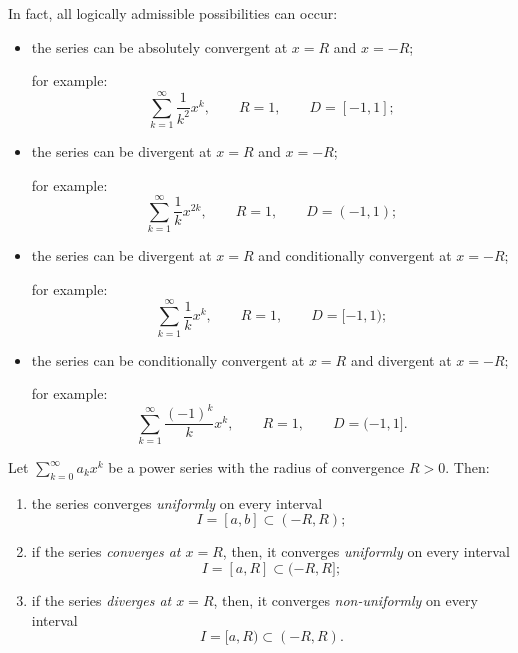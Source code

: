 In fact, all logically admissible possibilities can occur:
\begin{itemize}
    \item the series can be absolutely convergent at $x=R$ and $x=-R$;

    for example:
    \[
    \sum_{k=1}^{\infty}\frac{1}{k^2}x^k,
    \qquad R=1,
    \qquad D=[-1,1];
    \]

    \item the series can be divergent at $x=R$ and $x=-R$;

    for example:
    \[
    \sum_{k=1}^{\infty}\frac{1}{k}x^{2k},
    \qquad R=1,
    \qquad D=(-1,1);
    \]

    \item the series can be divergent at $x=R$ and conditionally convergent at $x=-R$;

    for example:
    \[
    \sum_{k=1}^{\infty}\frac{1}{k}x^k,
    \qquad R=1,
    \qquad D=[-1,1);
    \]

    \item the series can be conditionally convergent at $x=R$ and divergent at $x=-R$;

    for example:
    \[
    \sum_{k=1}^{\infty}\frac{(-1)^k}{k}x^k,
    \qquad R=1,
    \qquad D=(-1,1].
    \]
\end{itemize}

\begin{claim}\label{claim:7.3}
Let $\sum_{k=0}^{\infty}a_kx^k$ be a power series with the radius of convergence $R>0$.
Then:
\begin{enumerate}
    \item\label{item:claim:7.3:1} the series converges \emph{uniformly} on every interval
    \[
    I=[a,b]\subset(-R,R);
    \]

    \item\label{item:claim:7.3:2} if the series \emph{converges at $x=R$}, then, it converges \emph{uniformly} on every interval
    \[
    I=[a,R]\subset(-R,R];
    \]

    \item\label{item:claim:7.3:3} if the series \emph{diverges at $x=R$}, then, it converges \emph{non-uniformly} on every interval
    \[
    I=[a,R)\subset(-R,R).
    \]
\end{enumerate}
\end{claim}

